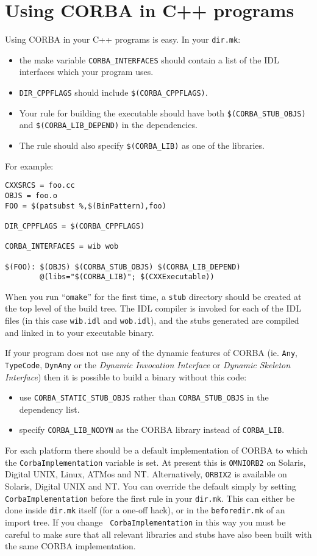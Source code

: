 \documentclass[11pt,twoside,onecolumn]{article}
\begin{document}
\section{Using CORBA in C++ programs}

Using CORBA in your C++ programs is easy.  In your {\tt dir.mk}:
\begin{itemize}
\item the make variable \verb|CORBA_INTERFACES| should contain a list of the
IDL interfaces which your program uses.
\item \verb|DIR_CPPFLAGS| should include \verb|$(CORBA_CPPFLAGS)|.
\item Your rule for building the executable should have both
\verb|$(CORBA_STUB_OBJS)| and \verb|$(CORBA_LIB_DEPEND)| in the dependencies.
\item The rule should also specify \verb|$(CORBA_LIB)| as one of the libraries.
\end{itemize}
For example:

{\footnotesize \begin{verbatim}
CXXSRCS = foo.cc
OBJS = foo.o
FOO = $(patsubst %,$(BinPattern),foo)

DIR_CPPFLAGS = $(CORBA_CPPFLAGS)

CORBA_INTERFACES = wib wob

$(FOO): $(OBJS) $(CORBA_STUB_OBJS) $(CORBA_LIB_DEPEND)
        @(libs="$(CORBA_LIB)"; $(CXXExecutable))
\end{verbatim}}

When you run ``{\tt omake}'' for the first time, a {\tt stub} directory should
be created at the top level of the build tree.  The IDL compiler is invoked for
each of the IDL files (in this case {\tt wib.idl} and {\tt wob.idl}), and the
stubs generated are compiled and linked in to your executable binary.

If your program does not use any of the dynamic features of CORBA
(ie. \verb|Any|, \verb|TypeCode|, \verb|DynAny| or the \emph{Dynamic
Invocation Interface} or \emph{Dynamic Skeleton Interface}) then it is
possible to build a binary without this code:
\begin{itemize}
\item use \verb|CORBA_STATIC_STUB_OBJS| rather than \verb|CORBA_STUB_OBJS| in
the dependency list.
\item specify \verb|CORBA_LIB_NODYN| as the CORBA library instead of
\verb|CORBA_LIB|.
\end{itemize}

For each platform there should be a default implementation of CORBA to which
the {\tt CorbaImplementation} variable is set. At present this is 
{\tt OMNIORB2} on Solaris, Digital UNIX, Linux, ATMos and
NT. Alternatively, {\tt ORBIX2} is available on Solaris, Digital UNIX and NT.
You can override the default simply by setting
{\tt CorbaImplementation} before the first rule in your {\tt dir.mk}.
This can either be done inside {\tt dir.mk} itself (for a one-off hack), or in
the {\tt beforedir.mk} of an import tree.  If you change {\tt
CorbaImplementation} in this way you must be careful to make sure that all
relevant libraries and stubs have also been built with the same CORBA
implementation.
\end{document}
